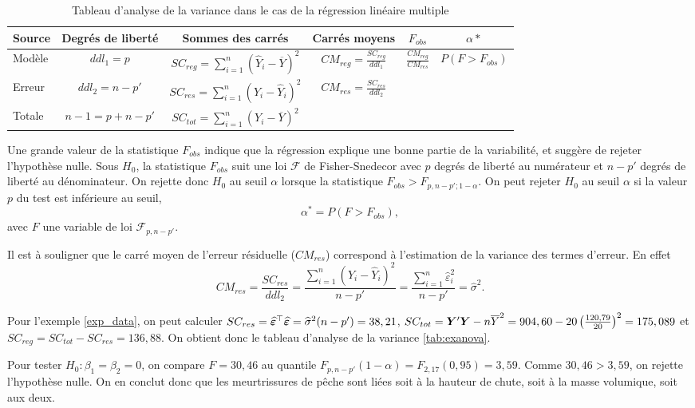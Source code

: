 \begin{table}[htb!]
\caption{Tableau d'analyse de la variance dans le cas de la régression linéaire multiple}\label{table:anova}
\centering
\renewcommand{\arraystretch}{1.6}
\begin{tabular}{lccccc}\hline
Source & Degrés de liberté & Sommes des carrés & Carrés moyens & $F_{obs}$ & $\alpha*$\\ \hline
Modèle & $ddl_1=p$ &
$SC_{reg}=\sum\limits_{i=1}^n(\widehat Y_i-\overline Y)^2$ & $CM_{reg}=\frac{\displaystyle SC_{reg}}{\displaystyle ddl_1}$ & $\frac{\displaystyle CM_{reg}}{\displaystyle CM_{res}}$ & $P(F > F_{obs})$\\
Erreur & $ddl_2=n-p'$ & $SC_{res}=\sum\limits_{i=1}^n(Y_i-\widehat Y_i)^2$ & $CM_{res}=\frac{\displaystyle SC_{res}}{\displaystyle ddl_2}$ & &\\
\hline Totale & $n-1=p+n-p'$ & $SC_{tot}=\sum\limits_{i=1}^n(Y_i-\overline Y)^2$ & & &\\
\hline
\end{tabular}
\end{table}

Une grande valeur de la statistique $F_{obs}$ indique que la régression explique une bonne partie de la variabilité, et suggère de rejeter l'hypothèse nulle. Sous $H_0$, la statistique $F_{obs}$ suit une loi $\mathcal F$ de Fisher-Snedecor avec $p$ degrés de liberté au numérateur et $n-p'$ degrés de liberté au
dénominateur. On rejette donc $H_0$ au seuil $\alpha$ lorsque la statistique
$ F_{obs} > F_{p,n-p';1-\alpha}$. On peut rejeter $H_0$ au seuil $\alpha$ si la valeur $p$ du test est inférieure au seuil,
$$ \alpha^* = P\left(F > F_{obs}\right), $$
avec $F$ une variable de loi $\mathcal{F}_{p,n-p'}$.


\begin{remarque}
Il est à souligner que le carré moyen de l'erreur résiduelle ($CM_{res}$) correspond à l'estimation de la variance des termes d'erreur. En effet
 \[CM_{res}=\frac{SC_{res}}{ddl_2}= \frac{\sum\limits_{i=1}^n (Y_i-\widehat{Y}_i)^2}{n-p'}=\frac{\sum\limits_{i=1}^n \widehat\varepsilon_i^2}{n-p'}=\widehat\sigma^2.
\]
\end{remarque}

\begin{exemple}
Pour l'exemple \ref{exp_data}, on peut calculer  $SC_{res}=\widehat{\bm\varepsilon}^\top\widehat{\bm\varepsilon}=\widehat\sigma^2 (n-p')=38,21$, $SC_{tot}=\bm{Y}'\bm{Y}-n\overline{Y}^2=904,60-20\left(\frac{120,79}{20}\right)^2=175,089$ et $SC_{reg}=SC_{tot}-SC_{res}=136,88.$ On obtient donc le tableau d'analyse de la variance \ref{tab:exanova}.

Pour tester $H_0:\beta_1=\beta_2=0$, on compare $F=30,46$ au quantile $F_{p,n-p'}(1-\alpha)=F_{2,17}(0,95)=3,59$. Comme $30,46>3,59$, on rejette l'hypothèse nulle. On en conclut donc que les meurtrissures de pêche sont liées soit à la hauteur de chute, soit à la masse volumique, soit aux deux.
\end{exemple}

